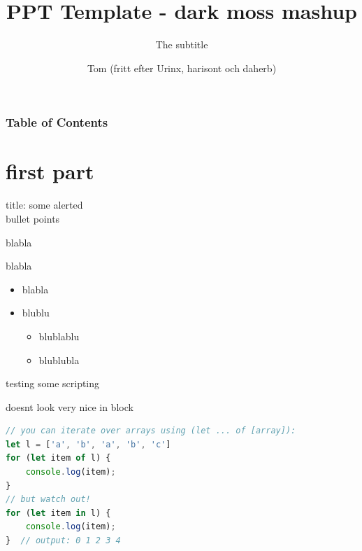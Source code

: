 \documentclass[notheorems, aspectratio=54, 14pt]{beamer}
\title[dark moss mashup Theme]{PPT Template - dark moss mashup}
\subtitle{The subtitle}
\author{Tom (fritt efter Urinx, harisont och daherb)}
\institute[GU Språkbanken Text]{tom.sodahl.bladsjo@svenska.gu.se}
\begin{document}

\frame[plain]{\titlepage}

\begin{frame}[noframenumbering]
\frametitle{Table of Contents}
\tableofcontents[subsectionstyle=hide, subsubsectionstyle=hide]
    
\end{frame}




\section{first part}

\begin{frame}{title: some alerted\\ bullet points}

blabla

blabla


\begin{itemize}[<alert@+|+->]
    \item blabla
    \item blublu
    \begin{itemize}
        \item blublablu
        \item[2.2] blublubla
    \end{itemize}
\end{itemize}
    
\end{frame}

\begin{frame}[fragile]{testing some scripting}

\begin{block}{doesnt look very nice in block}
    \begin{lstlisting}[language=JavaScript]
// you can iterate over arrays using (let ... of [array]):
let l = ['a', 'b', 'a', 'b', 'c']
for (let item of l) {
    console.log(item);
}
// but watch out!
for (let item in l) {
    console.log(item);
}  // output: 0 1 2 3 4 
\end{lstlisting}
\end{block}
    
\end{frame}
\end{document}
